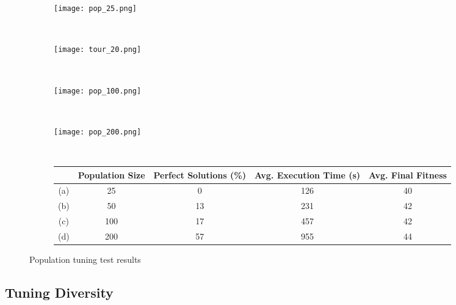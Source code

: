 \begin{figure}
	\centering
	\begin{subfigure}[ht]{0.49\textwidth}
		\texttt{[image: pop\_25.png]}
		\caption{}
		\vspace{1em}
	\end{subfigure}
	~
	\begin{subfigure}[ht]{0.49\textwidth}
		\texttt{[image: tour\_20.png]}
		\caption{}
		\vspace{1em}
	\end{subfigure}
	~
	\begin{subfigure}[ht]{0.49\textwidth}
		\texttt{[image: pop\_100.png]}
		\caption{}
		\vspace{1em}
	\end{subfigure}
	~
	\begin{subfigure}[ht]{0.49\textwidth}
		\texttt{[image: pop\_200.png]}
		\caption{}
		\vspace{1em}
	\end{subfigure}
	~
	\begin{subfigure}[ht]{\textwidth}
		\centering
		\begin{tabular}{ccccc}
			\toprule
			& \bfseries{Population Size} &
			\bfseries{Perfect Solutions (\%)} &
			\bfseries{Avg. Execution Time (s)} & \bfseries{Avg. Final Fitness}\\
			\midrule
			(a) & 25 & 0 & 126 & 40\\
			(b) & 50 & 13 & 231 & 42\\
			(c) & 100 & 17 & 457 & 42\\
			(d) & 200 & 57 & 955 & 44\\
			\bottomrule
		\end{tabular}
	\end{subfigure}

	\caption[Population tuning test results]{Population tuning test results}
\end{figure}

\subsection{Tuning Diversity}

